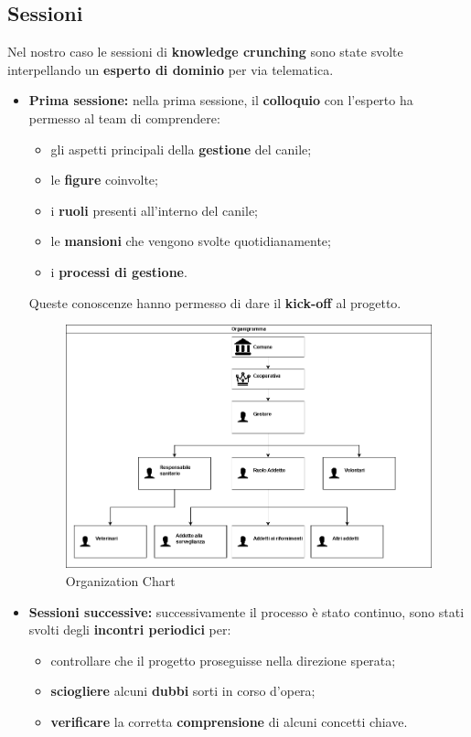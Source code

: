     \subsection{Sessioni}
	Nel nostro caso le sessioni di \textbf{knowledge crunching} sono state svolte interpellando un \textbf{esperto di dominio} per via telematica.
	\begin{itemize}
	    \item \textbf{Prima sessione:} nella prima sessione, il \textbf{colloquio} con l'esperto ha permesso al team di comprendere:
	    \begin{itemize}
	        \item gli aspetti principali della \textbf{gestione} del canile;
	        \item le \textbf{figure} coinvolte;
	        \item i \textbf{ruoli} presenti all'interno del canile;
	        \item le \textbf{mansioni} che vengono svolte quotidianamente;
	        \item i \textbf{processi di gestione}.
	    \end{itemize}
	    Queste conoscenze hanno permesso di dare il \textbf{kick-off} al progetto.
        \begin{figure}[ht]
            \caption{Organization Chart}
            \centering
            \includegraphics[width=1\textwidth]{DrawIo/organizationChart.png}
        \end{figure}
	    \item \textbf{Sessioni successive:} successivamente il processo è stato continuo, sono stati svolti degli \textbf{incontri periodici} per:
	    \begin{itemize}
	        \item controllare che il progetto proseguisse nella direzione sperata;
	        \item \textbf{sciogliere} alcuni \textbf{dubbi} sorti in corso d'opera;
	        \item \textbf{verificare} la corretta \textbf{comprensione} di alcuni concetti chiave. 
	    \end{itemize}
	\end{itemize}
    
